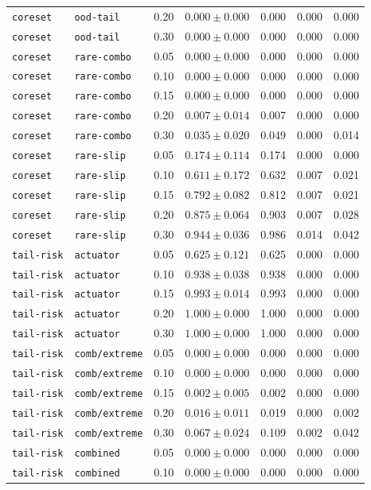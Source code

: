 \documentclass{article}
\begin{document}
\begin{center}
\begin{tabular}{lllcccc}
\texttt{coreset} & \texttt{ood-tail} & 0.20 & $0.000 \pm 0.000$ & 0.000 & 0.000 & 0.000 \\
\texttt{coreset} & \texttt{ood-tail} & 0.30 & $0.000 \pm 0.000$ & 0.000 & 0.000 & 0.000 \\
\texttt{coreset} & \texttt{rare-combo} & 0.05 & $0.000 \pm 0.000$ & 0.000 & 0.000 & 0.000 \\
\texttt{coreset} & \texttt{rare-combo} & 0.10 & $0.000 \pm 0.000$ & 0.000 & 0.000 & 0.000 \\
\texttt{coreset} & \texttt{rare-combo} & 0.15 & $0.000 \pm 0.000$ & 0.000 & 0.000 & 0.000 \\
\texttt{coreset} & \texttt{rare-combo} & 0.20 & $0.007 \pm 0.014$ & 0.007 & 0.000 & 0.000 \\
\texttt{coreset} & \texttt{rare-combo} & 0.30 & $0.035 \pm 0.020$ & 0.049 & 0.000 & 0.014 \\
\texttt{coreset} & \texttt{rare-slip} & 0.05 & $0.174 \pm 0.114$ & 0.174 & 0.000 & 0.000 \\
\texttt{coreset} & \texttt{rare-slip} & 0.10 & $0.611 \pm 0.172$ & 0.632 & 0.007 & 0.021 \\
\texttt{coreset} & \texttt{rare-slip} & 0.15 & $0.792 \pm 0.082$ & 0.812 & 0.007 & 0.021 \\
\texttt{coreset} & \texttt{rare-slip} & 0.20 & $0.875 \pm 0.064$ & 0.903 & 0.007 & 0.028 \\
\texttt{coreset} & \texttt{rare-slip} & 0.30 & $0.944 \pm 0.036$ & 0.986 & 0.014 & 0.042 \\
\texttt{tail-risk} & \texttt{actuator} & 0.05 & $0.625 \pm 0.121$ & 0.625 & 0.000 & 0.000 \\
\texttt{tail-risk} & \texttt{actuator} & 0.10 & $0.938 \pm 0.038$ & 0.938 & 0.000 & 0.000 \\
\texttt{tail-risk} & \texttt{actuator} & 0.15 & $0.993 \pm 0.014$ & 0.993 & 0.000 & 0.000 \\
\texttt{tail-risk} & \texttt{actuator} & 0.20 & $1.000 \pm 0.000$ & 1.000 & 0.000 & 0.000 \\
\texttt{tail-risk} & \texttt{actuator} & 0.30 & $1.000 \pm 0.000$ & 1.000 & 0.000 & 0.000 \\
\texttt{tail-risk} & \texttt{comb/extreme} & 0.05 & $0.000 \pm 0.000$ & 0.000 & 0.000 & 0.000 \\
\texttt{tail-risk} & \texttt{comb/extreme} & 0.10 & $0.000 \pm 0.000$ & 0.000 & 0.000 & 0.000 \\
\texttt{tail-risk} & \texttt{comb/extreme} & 0.15 & $0.002 \pm 0.005$ & 0.002 & 0.000 & 0.000 \\
\texttt{tail-risk} & \texttt{comb/extreme} & 0.20 & $0.016 \pm 0.011$ & 0.019 & 0.000 & 0.002 \\
\texttt{tail-risk} & \texttt{comb/extreme} & 0.30 & $0.067 \pm 0.024$ & 0.109 & 0.002 & 0.042 \\
\texttt{tail-risk} & \texttt{combined} & 0.05 & $0.000 \pm 0.000$ & 0.000 & 0.000 & 0.000 \\
\texttt{tail-risk} & \texttt{combined} & 0.10 & $0.000 \pm 0.000$ & 0.000 & 0.000 & 0.000 \\
\bottomrule
\end{tabular}
\end{center}
\end{document}
